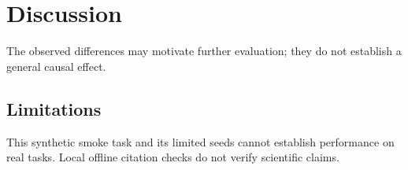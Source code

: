\section{Discussion}
The observed differences may motivate further evaluation; they do not establish a general causal effect.
\subsection{Limitations}
This synthetic smoke task and its limited seeds cannot establish performance on real tasks. Local offline citation checks do not verify scientific claims.

